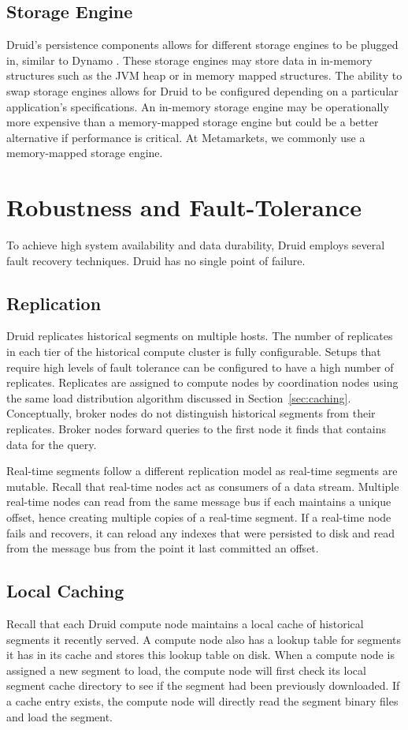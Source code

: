 \documentclass{vldb}
\begin{document}
\subsection{Storage Engine}
Druid’s persistence components allows for different storage engines to
be plugged in, similar to Dynamo \cite{decandia2007dynamo}. These storage engines may store
data in in-memory structures such as the JVM heap or in memory mapped
structures. The ability to swap storage engines allows for Druid to be
configured depending on a particular application’s specifications. An
in-memory storage engine may be operationally more expensive than a
memory-mapped storage engine but could be a better alternative if
performance is critical. At Metamarkets, we commonly use a
memory-mapped storage engine.

\section{Robustness and Fault-Tolerance}
\label{sec:robustness}
To achieve high system availability and data durability, Druid employs
several fault recovery techniques. Druid has no single point of
failure.

\subsection{Replication}
Druid replicates historical segments on multiple hosts. The number of
replicates in each tier of the historical compute cluster is fully
configurable. Setups that require high levels of fault tolerance can
be configured to have a high number of replicates. Replicates are
assigned to compute nodes by coordination nodes using the same load
distribution algorithm discussed in Section~\ref{sec:caching}. Conceptually,
broker nodes do not distinguish historical segments from their
replicates. Broker nodes forward queries to the first node it finds
that contains data for the query.

Real-time segments follow a different replication model as real-time
segments are mutable. Recall that real-time nodes act as consumers of
a data stream. Multiple real-time nodes can read from the same message
bus if each maintains a unique offset, hence creating multiple copies
of a real-time segment. If a real-time node fails and recovers, it can
reload any indexes that were persisted to disk and read from the
message bus from the point it last committed an offset.

\subsection{Local Caching}
Recall that each Druid compute node maintains a local cache of
historical segments it recently served. A compute node also has a
lookup table for segments it has in its cache and stores this lookup
table on disk. When a compute node is assigned a new segment to load,
the compute node will first check its local segment cache directory to
see if the segment had been previously downloaded. If a cache entry
exists, the compute node will directly read the segment binary files
and load the segment.
\end{document}

